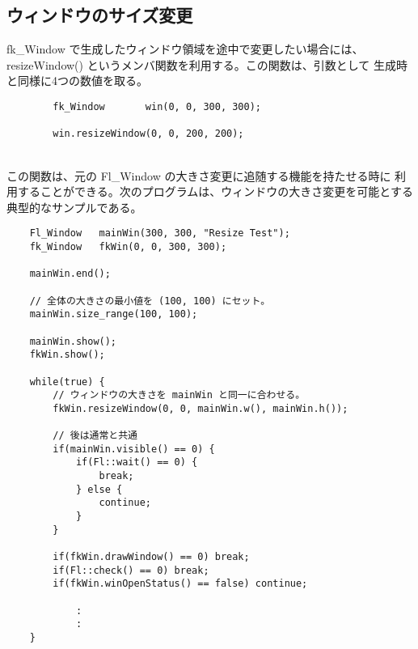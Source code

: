 \subsection{ウィンドウのサイズ変更}
fk\_Window で生成したウィンドウ領域を途中で変更したい場合には、
resizeWindow() というメンバ関数を利用する。この関数は、引数として
生成時と同様に4つの数値を取る。
\\
\begin{screen}
\begin{verbatim}
        fk_Window       win(0, 0, 300, 300);

        win.resizeWindow(0, 0, 200, 200);
\end{verbatim}
\end{screen}
~ \\
この関数は、元の Fl\_Window の大きさ変更に追随する機能を持たせる時に
利用することができる。次のプログラムは、ウィンドウの大きさ変更を可能とする
典型的なサンプルである。
\\
\begin{breakbox}
\begin{verbatim}
    Fl_Window   mainWin(300, 300, "Resize Test");
    fk_Window   fkWin(0, 0, 300, 300);

    mainWin.end();

    // 全体の大きさの最小値を (100, 100) にセット。
    mainWin.size_range(100, 100);

    mainWin.show();
    fkWin.show();

    while(true) {
        // ウィンドウの大きさを mainWin と同一に合わせる。        
        fkWin.resizeWindow(0, 0, mainWin.w(), mainWin.h());

        // 後は通常と共通
        if(mainWin.visible() == 0) {
            if(Fl::wait() == 0) {
                break;
            } else {
                continue;
            }
        }

        if(fkWin.drawWindow() == 0) break;
        if(Fl::check() == 0) break;
        if(fkWin.winOpenStatus() == false) continue;

            :
            :
    }
\end{verbatim}
\end{breakbox}

